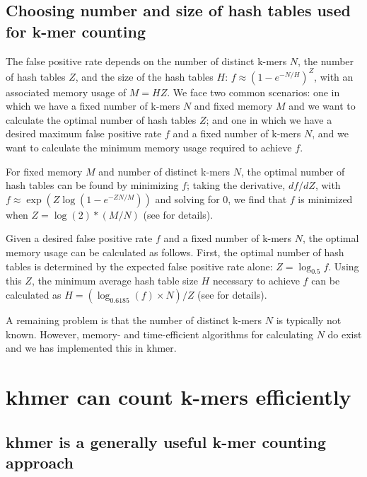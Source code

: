 \subsection{Choosing number and size of hash tables used for k-mer counting}

The false positive rate depends on the number of distinct k-mers $N$,
the number of hash tables $Z$, and the size of the hash tables $H$: $f
\approx (1-e^{-N/H})^{Z}$, with an associated memory usage of $M = H
Z$.  We face two common scenarios: one in which we have a fixed number
of k-mers $N$ and fixed memory $M$ and we want to calculate the
optimal number of hash tables $Z$; and one in which we have a desired
maximum false positive rate $f$ and a fixed number of k-mers $N$, and
we want to calculate the minimum memory usage required to achieve $f$.

For fixed memory $M$ and number of distinct k-mers $N$, the optimal
number of hash tables can be found by minimizing $f$; taking the
derivative, $df/dZ$, with $f \approx \exp(Z \log(1-e^{-ZN/M}))$ and solving
for 0, we find that $f$ is minimized when $Z=\log(2)*(M/N)$ (see
\cite{broder2004network} for details).

Given a desired false positive rate $f$ and a fixed number of k-mers
$N$, the optimal memory usage can be calculated as follows.  First,
the optimal number of hash tables is determined by the expected false
positive rate alone: $Z = \log_{0.5}f$.  Using this $Z$, the minimum
average hash table size $H$ necessary to achieve $f$ can be calculated
as $H = (\log_{0.6185}(f)\times N)/Z$ (see
\cite{broder2004network} for details).

A remaining problem is that the number of distinct k-mers $N$ is
typically not known.  However, memory- and time-efficient algorithms
for calculating $N$ do exist and we has implemented this in
khmer\cite{flajolet2008hyperloglog}.


\section{khmer can count k-mers efficiently}


\subsection{khmer is a generally useful k-mer counting approach}


